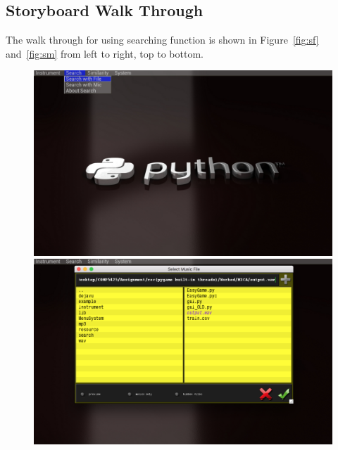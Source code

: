 \documentclass[whitelogo,12pt]{tudelft-report}
\begin{document}
\subsection{Storyboard Walk Through}
The walk through for  using searching function is shown in Figure~\ref{fig:sf} and~\ref{fig:sm} from left to right, top to bottom.

\begin{figure}[!htb]
  \includegraphics[width=\linewidth]{sf1}
\endminipage\hfill
{}
  \includegraphics[width=\linewidth]{if2}
\endminipage\hfill\\


\end{figure}
\end{document}
